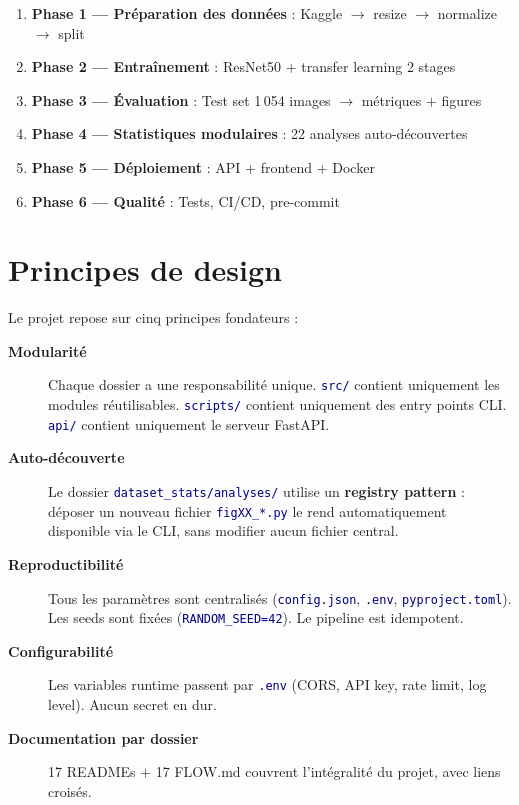 \documentclass[11pt,a4paper,oneside]{report}
\newcommand{\code}[1]{\texttt{\textcolor{navy}{#1}}}
\begin{document}
\begin{infobox}
\begin{enumerate}
\item \textbf{Phase 1 — Préparation des données} : Kaggle $\to$ resize $\to$ normalize $\to$ split
\item \textbf{Phase 2 — Entraînement} : ResNet50 + transfer learning 2 stages
\item \textbf{Phase 3 — Évaluation} : Test set 1\,054 images $\to$ métriques $+$ figures
\item \textbf{Phase 4 — Statistiques modulaires} : 22 analyses auto-découvertes
\item \textbf{Phase 5 — Déploiement} : API + frontend + Docker
\item \textbf{Phase 6 — Qualité} : Tests, CI/CD, pre-commit
\end{enumerate}
\end{infobox}

\section{Principes de design}

Le projet repose sur cinq principes fondateurs :

\begin{description}
\item[\textbf{Modularité}] Chaque dossier a une responsabilité unique. \code{src/} contient uniquement les modules réutilisables. \code{scripts/} contient uniquement des entry points CLI. \code{api/} contient uniquement le serveur FastAPI.

\item[\textbf{Auto-découverte}] Le dossier \code{dataset\_stats/analyses/} utilise un \textbf{registry pattern} : déposer un nouveau fichier \code{figXX\_*.py} le rend automatiquement disponible via le CLI, sans modifier aucun fichier central.

\item[\textbf{Reproductibilité}] Tous les paramètres sont centralisés (\code{config.json}, \code{.env}, \code{pyproject.toml}). Les seeds sont fixées (\code{RANDOM\_SEED=42}). Le pipeline est idempotent.

\item[\textbf{Configurabilité}] Les variables runtime passent par \code{.env} (CORS, API key, rate limit, log level). Aucun secret en dur.

\item[\textbf{Documentation par dossier}] 17 READMEs $+$ 17 FLOW.md couvrent l'intégralité du projet, avec liens croisés.
\end{description}
\end{document}
